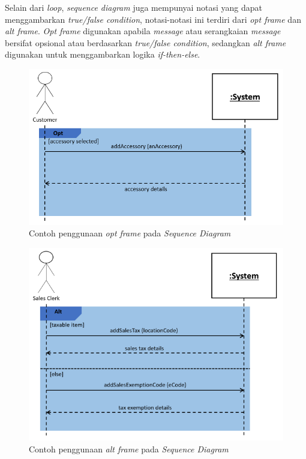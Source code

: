 \documentclass[a4paper]{article}
\begin{document}
\begin{enumerate}
    Selain dari \textit{loop}, \textit{sequence diagram} juga mempunyai notasi yang dapat menggambarkan \textit{true/false condition}, notasi-notasi ini terdiri dari \textit{opt frame} dan \textit{alt frame}. \textit{Opt frame} digunakan apabila \textit{message} atau serangkaian \textit{message} bersifat opsional atau berdasarkan \textit{true/false condition}, sedangkan \textit{alt frame} digunakan untuk menggambarkan logika \textit{if-then-else}\autocite[139-146]{uml-satzinger}.
    \newpage
    \begin{figure}[h]
        \centering
        \includegraphics[scale=0.5]{images/uml satzinger/sequence diagram/opt frame example.png}
        \caption{Contoh penggunaan \textit{opt frame} pada \textit{Sequence Diagram}}
    \end{figure}

    \begin{figure}[h]
        \centering
        \includegraphics[scale=0.5]{images/uml satzinger/sequence diagram/alt frame example.png}
        \caption{Contoh penggunaan \textit{alt frame} pada \textit{Sequence Diagram}}
    \end{figure}
    
\end{enumerate}
\end{document}
